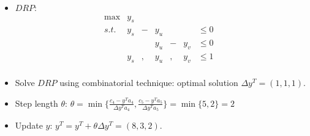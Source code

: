 \documentclass[mathserif]{beamer}
\begin{document}
{\begin{small}
\begin{itemize}
%   
\item $DRP$:   
\[
\begin{array}{rrrrrrrrrl}
 \max & y_s   & &    \\
 s.t. & y_s &-& y_u  & &     &  \leq 0 &  \\
     &  & &   y_u   &-& y_v &  \leq 0 & \\
      & y_s &,& y_u  &,& y_v &  \leq 1 &  \\
\end{array} \nonumber
\]
  


\item  Solve $DRP$  using combinatorial technique: optimal solution  $\Delta {y^T} = (1, 1, 1)$. 

\item Step length $\theta$: $\theta = \min \{ 
\frac{ {c_4 - y^Ta_4} }{ {\Delta y^T a_4}  } ,
\frac{ {c_5 - y^Ta_5} }{ {\Delta y^T a_5}  } 
\} = \min\{ 5, 2 \} = 2$

\item Update ${y}$: ${y^T=y^T}+\theta \Delta {y^T}  = (8, 3, 2)$. 

\begin{figure}
\begin{tikzpicture}[scale=0.8, auto,swap]


\end{tikzpicture}
\end{figure}
\end{itemize}
\end{small}}
\end{document}
